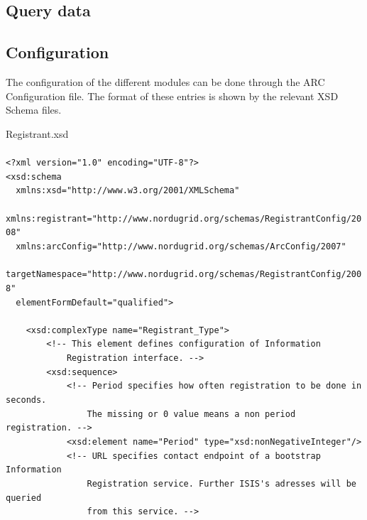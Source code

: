 \documentclass{article}                            %
\begin{document}
\subsection{Query data}
\label{Query data}

\subsection{Configuration}
\label{Configuration}
The configuration of the different modules can be done through the ARC Configuration file. The format of these entries is shown by the relevant XSD Schema files.

\begin{framed}
Registrant.xsd\\
\\
\verb#<?xml version="1.0" encoding="UTF-8"?>#\\
\verb#<xsd:schema#\\
\verb#  xmlns:xsd="http://www.w3.org/2001/XMLSchema"#\\
\verb#  xmlns:registrant="http://www.nordugrid.org/schemas/RegistrantConfig/2008"#\\
\verb#  xmlns:arcConfig="http://www.nordugrid.org/schemas/ArcConfig/2007"#\\
\verb#  targetNamespace="http://www.nordugrid.org/schemas/RegistrantConfig/2008"#\\
\verb#  elementFormDefault="qualified">#\\
\verb# #\\
\verb#    <xsd:complexType name="Registrant_Type">#\\
\verb#        <!-- This element defines configuration of Information #\\
\verb#            Registration interface. -->#\\
\verb#        <xsd:sequence>#\\
\verb#            <!-- Period specifies how often registration to be done in seconds.#\\
\verb#                The missing or 0 value means a non period registration. -->#\\
\verb#            <xsd:element name="Period" type="xsd:nonNegativeInteger"/>#\\
\verb#            <!-- URL specifies contact endpoint of a bootstrap Information#\\
\verb#                Registration service. Further ISIS's adresses will be queried#\\
\verb#                from this service. -->#\\

\end{framed}
\end{document}
